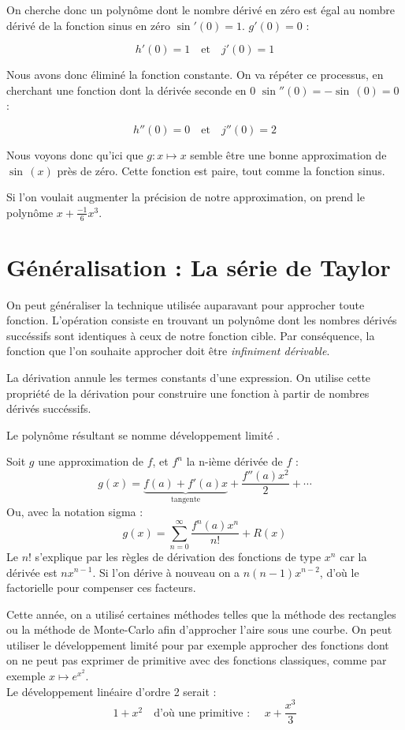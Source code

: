 \documentclass[DIV=12]{scrartcl}
\begin{document}
    On cherche donc un polynôme dont le nombre dérivé en zéro est égal au nombre dérivé de la fonction sinus en zéro $\sin'(0)=1$. $g'(0)=0$ :
    
    \[h'(0)=1\quad\text{et}\quad j'(0)=1\]

    Nous avons donc éliminé la fonction constante. On va répéter ce processus, en cherchant une fonction dont la dérivée seconde en 0 $\sin''(0)=-\sin\,(0)=0$ :
    
    \[h''(0)=0\quad\text{et}\quad j''(0)=2\]

    Nous voyons donc qu'ici que $g:x\mapsto x$ semble être une bonne approximation de~$\sin\,(x)$ près de zéro. Cette fonction est paire, tout comme la fonction sinus.

    Si l'on voulait augmenter la précision de notre approximation, on prend le polynôme $x+\frac{-1}{6}x^3$.

    \section{Généralisation : La série de Taylor}
    On peut généraliser la technique utilisée auparavant pour approcher toute fonction. L'opération consiste en trouvant un polynôme dont les nombres dérivés succéssifs sont identiques à ceux de notre fonction cible. Par conséquence, la fonction que l'on souhaite approcher doit être \emph{infiniment dérivable}.

    La dérivation annule les termes constants d'une expression. On utilise cette propriété de la dérivation pour construire une fonction à partir de nombres dérivés succéssifs.

    Le polynôme résultant se nomme \og développement limité \fg{}.

    Soit $g$ une approximation de $f$, et $f^n$ la n-ième dérivée de $f$ : \[g(x)=\underbrace{f(a)+f'(a)x}_\text{tangente}+\frac{f''(a)x^2}{2}+\dotsb\] Ou, avec la notation sigma : \[g(x)=\sum_{n=0}^{\infty}\frac{f^n(a)x^n}{n!}+R(x)\]
    Le $n!$ s'explique par les règles de dérivation des fonctions de type $x^n$ car la dérivée est $nx^{n-1}$. Si l'on dérive à nouveau on a $n(n-1)x^{n-2}$, d'où le factorielle pour compenser ces facteurs.

    Cette année, on a utilisé certaines méthodes telles que la méthode des rectangles ou la méthode de Monte-Carlo afin d'approcher l'aire sous une courbe. On peut utiliser le développement limité pour par exemple approcher des fonctions dont on ne peut pas exprimer de primitive avec des fonctions classiques, comme par exemple $x\mapsto e^{x^2}$. \\ Le développement linéaire d'ordre 2 serait : \[1+x^2\quad\text{d'où une primitive : }\quad x+\frac{x^3}{3}\]
\end{document}
